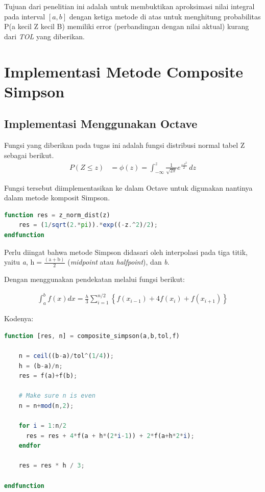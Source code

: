 \documentclass[journal,12pt,onecolumn,a4paper]{IEEEtran}
\begin{document}
Tujuan dari penelitian ini adalah untuk membuktikan aproksimasi nilai integral pada interval \([a, b]\) dengan ketiga metode di atas untuk menghitung probabilitas P(a kecil Z kecil B) memiliki error (perbandingan dengan nilai aktual) kurang dari \emph{TOL} yang diberikan.

\section{Implementasi Metode Composite Simpson}

\subsection{Implementasi Menggunakan Octave}

\par Fungsi yang diberikan pada tugas ini adalah fungsi distribusi normal tabel Z sebagai berikut.
\begin{equation*}
	\begin{split}
		P(Z \le z ) & = \phi(z) = \int_{-\infty}^{z} \frac{1}{\sqrt{2\pi}}e ^{\frac{-z^2}{2}} \,dz
	\end{split}
\end{equation*}

Fungsi tersebut diimplementasikan ke dalam Octave untuk digunakan nantinya dalam metode komposit Simpson.

\begin{center}
	\begin{lstlisting}[language=Octave]
function res = z_norm_dist(z)
	res = (1/sqrt(2.*pi)).*exp((-z.^2)/2);
endfunction
	\end{lstlisting}
\end{center}

Perlu diingat bahwa metode Simpson didasari oleh interpolasi pada tiga titik, yaitu \emph{a}, \(\mathrm{h=\frac{(a+b)}{2}}\) (\emph{midpoint} atau \emph{halfpoint}), dan \emph{b}.

Dengan menggunakan pendekatan melalui fungsi berikut:

\begin{equation*}
	\begin{split}
		\int_{a}^{b}f(x)dx=\frac{h}{3}\sum_{i=1}^{n/2}\left \{ f(x_{i-1})+4f(x_{i})+f(x_{i+1}) \right \}
	\end{split}
\end{equation*}

Kodenya:

\begin{center}
	\begin{lstlisting}[language=Octave]
function [res, n] = composite_simpson(a,b,tol,f)

	n = ceil((b-a)/tol^(1/4));
	h = (b-a)/n;
	res = f(a)+f(b);
	 
	# Make sure n is even
	n = n+mod(n,2);
	 
	for i = 1:n/2
	  res = res + 4*f(a + h*(2*i-1)) + 2*f(a+h*2*i);
	endfor
	 
	res = res * h / 3;
	 
endfunction
	\end{lstlisting}
\end{center}
\end{document}
